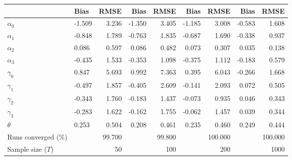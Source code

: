 
\begin{tabular}[t]{llrrrrrrr}
\toprule
  & Bias & RMSE & Bias & RMSE & Bias & RMSE & Bias & RMSE\\
\midrule
$\alpha_{0}$ & -1.509 & 3.236 & -1.350 & 3.405 & -1.185 & 3.008 & -0.583 & 1.608\\
$\alpha_{1}$ & -0.848 & 1.789 & -0.763 & 1.835 & -0.687 & 1.690 & -0.338 & 0.937\\
$\alpha_{2}$ & 0.086 & 0.597 & 0.086 & 0.482 & 0.073 & 0.307 & 0.035 & 0.138\\
$\alpha_{3}$ & -0.435 & 1.533 & -0.353 & 1.098 & -0.375 & 1.112 & -0.183 & 0.579\\
$\gamma_{0}$ & 0.847 & 5.693 & 0.992 & 7.363 & 0.395 & 6.043 & -0.266 & 1.668\\
$\gamma_{1}$ & -0.497 & 1.857 & -0.405 & 2.609 & -0.141 & 2.093 & 0.072 & 0.505\\
$\gamma_{2}$ & -0.343 & 1.760 & -0.183 & 1.437 & -0.073 & 0.935 & 0.046 & 0.343\\
$\gamma_{3}$ & -0.283 & 1.622 & -0.162 & 1.755 & -0.062 & 1.457 & 0.039 & 0.344\\
$\theta$ & 0.253 & 0.504 & 0.208 & 0.461 & 0.235 & 0.460 & 0.249 & 0.444\\
Runs converged (\%) &  & 99.700 &  & 99.800 &  & 100.000 &  & 100.000\\
Sample size ($T$) &  & 50 &  & 100 &  & 200 &  & 1000\\
\bottomrule
\end{tabular}
